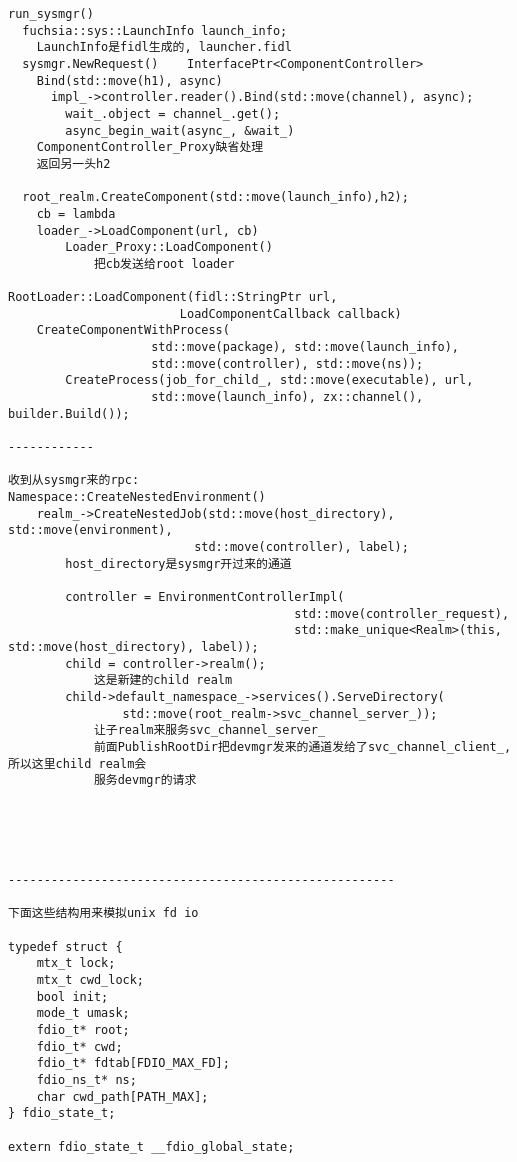 \begin{verbatim}
run_sysmgr()
  fuchsia::sys::LaunchInfo launch_info;
    LaunchInfo是fidl生成的, launcher.fidl
  sysmgr.NewRequest()    InterfacePtr<ComponentController>
    Bind(std::move(h1), async)
      impl_->controller.reader().Bind(std::move(channel), async);
        wait_.object = channel_.get();
        async_begin_wait(async_, &wait_)
    ComponentController_Proxy缺省处理
    返回另一头h2

  root_realm.CreateComponent(std::move(launch_info),h2);
    cb = lambda
    loader_->LoadComponent(url, cb)
        Loader_Proxy::LoadComponent()
            把cb发送给root loader

RootLoader::LoadComponent(fidl::StringPtr url,
                        LoadComponentCallback callback)
    CreateComponentWithProcess(
                    std::move(package), std::move(launch_info),
                    std::move(controller), std::move(ns));
        CreateProcess(job_for_child_, std::move(executable), url,
                    std::move(launch_info), zx::channel(), builder.Build());

------------

收到从sysmgr来的rpc:
Namespace::CreateNestedEnvironment()
    realm_->CreateNestedJob(std::move(host_directory), std::move(environment),
                          std::move(controller), label);
        host_directory是sysmgr开过来的通道

        controller = EnvironmentControllerImpl(
                                        std::move(controller_request),
                                        std::make_unique<Realm>(this, std::move(host_directory), label));
        child = controller->realm();
            这是新建的child realm
        child->default_namespace_->services().ServeDirectory(
                std::move(root_realm->svc_channel_server_));
            让子realm来服务svc_channel_server_
            前面PublishRootDir把devmgr发来的通道发给了svc_channel_client_, 所以这里child realm会
            服务devmgr的请求





------------------------------------------------------

下面这些结构用来模拟unix fd io

typedef struct {
    mtx_t lock;
    mtx_t cwd_lock;
    bool init;
    mode_t umask;
    fdio_t* root;
    fdio_t* cwd;
    fdio_t* fdtab[FDIO_MAX_FD];
    fdio_ns_t* ns;
    char cwd_path[PATH_MAX];
} fdio_state_t;

extern fdio_state_t __fdio_global_state;


\end{verbatim}

